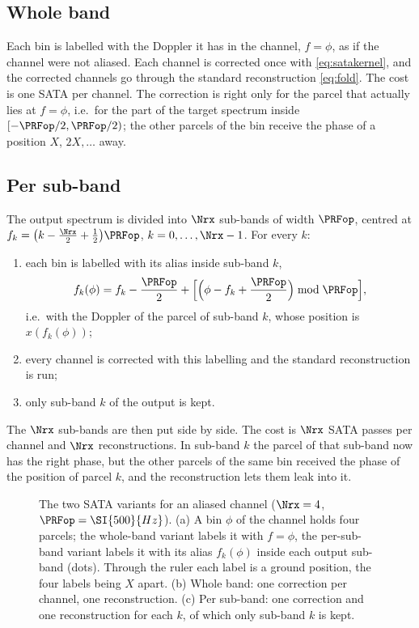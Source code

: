 \subsection{Whole band}

Each bin is labelled with the Doppler it has in the channel, $f=\phi$, as if the channel were not aliased. Each channel is
corrected once with \eqref{eq:satakernel}, and the corrected channels go through the standard reconstruction \eqref{eq:fold}.
The cost is one SATA per channel. The correction is right only for the parcel that actually lies at $f=\phi$, i.e.\ for the
part of the target spectrum inside $[-\PRFop/2,\PRFop/2)$; the other parcels of the bin receive the phase of a position
$X$, $2X,\dots$ away.

\subsection{Per sub-band}

The output spectrum is divided into $\Nrx$ sub-bands of width $\PRFop$, centred at
$f_k=\bigl(k-\frac{\Nrx}{2}+\frac12\bigr)\PRFop$, $k=0,\dots,\Nrx-1$. For every $k$:
\begin{enumerate}
  \item each bin is labelled with its alias inside sub-band $k$,
        \begin{equation}
          f_k(\phi)=f_k-\frac{\PRFop}{2}+\Bigl[\Bigl(\phi-f_k+\frac{\PRFop}{2}\Bigr)\bmod\PRFop\Bigr],
        \end{equation}
        i.e.\ with the Doppler of the parcel of sub-band $k$, whose position is $x(f_k(\phi))$;
  \item every channel is corrected with this labelling and the standard reconstruction is run;
  \item only sub-band $k$ of the output is kept.
\end{enumerate}
The $\Nrx$ sub-bands are then put side by side. The cost is $\Nrx$ SATA passes per channel and $\Nrx$ reconstructions. In
sub-band $k$ the parcel of that sub-band now has the right phase, but the other parcels of the same bin received the phase of
the position of parcel $k$, and the reconstruction lets them leak into it.

\begin{figure}[htbp]
\centering

\caption[The two SATA variants]{The two SATA variants for an aliased channel ($\Nrx=4$, $\PRFop=\SI{500}{Hz}$). (a) A bin
$\phi$ of the channel holds four parcels; the whole-band variant labels it with $f=\phi$, the per-sub-band variant labels it
with its alias $f_k(\phi)$ inside each output sub-band (dots). Through the ruler each label is a ground position, the four labels
being $X$ apart. (b) Whole band: one correction per channel, one reconstruction. (c) Per sub-band: one correction and one
reconstruction for each $k$, of which only sub-band $k$ is kept.}
\label{fig:satavariants}
\end{figure}

